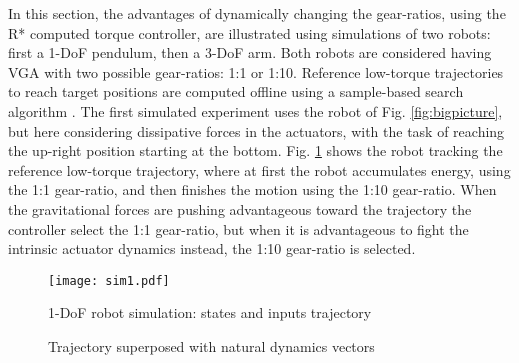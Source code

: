 In this section, the advantages of dynamically changing the gear-ratios, using the R* computed torque controller, are illustrated using simulations of two robots: first a 1-DoF pendulum, then a 3-DoF arm. Both robots are considered having VGA with two possible gear-ratios: 1:1 or 1:10. Reference low-torque trajectories to reach target positions are computed offline using a sample-based search algorithm \cite{lavalle_planning_2006}. 
%
The first simulated experiment uses the robot of Fig. \ref{fig:bigpicture}, but here considering dissipative forces in the actuators, with the task of reaching the up-right position starting at the bottom. Fig. \ref{fig:sim1} shows the robot tracking the reference low-torque trajectory, where at first the robot accumulates energy, using the 1:1 gear-ratio, and then finishes the motion using the 1:10 gear-ratio. When the gravitational forces are pushing advantageous toward the trajectory the controller select the 1:1 gear-ratio, but when it is advantageous to fight the intrinsic actuator dynamics instead, the 1:10 gear-ratio is selected. 
%
\begin{figure}[htp]
	\centering
		\texttt{[image: sim1.pdf]}
	\caption{1-DoF robot simulation: states and inputs trajectory}
	\label{fig:sim1}
\end{figure}
%
%
\begin{figure}[htp]
				\vspace{-10pt}
        \centering
        \caption{Trajectory superposed with natural dynamics vectors}
				\label{fig:pps}
\end{figure}

%

